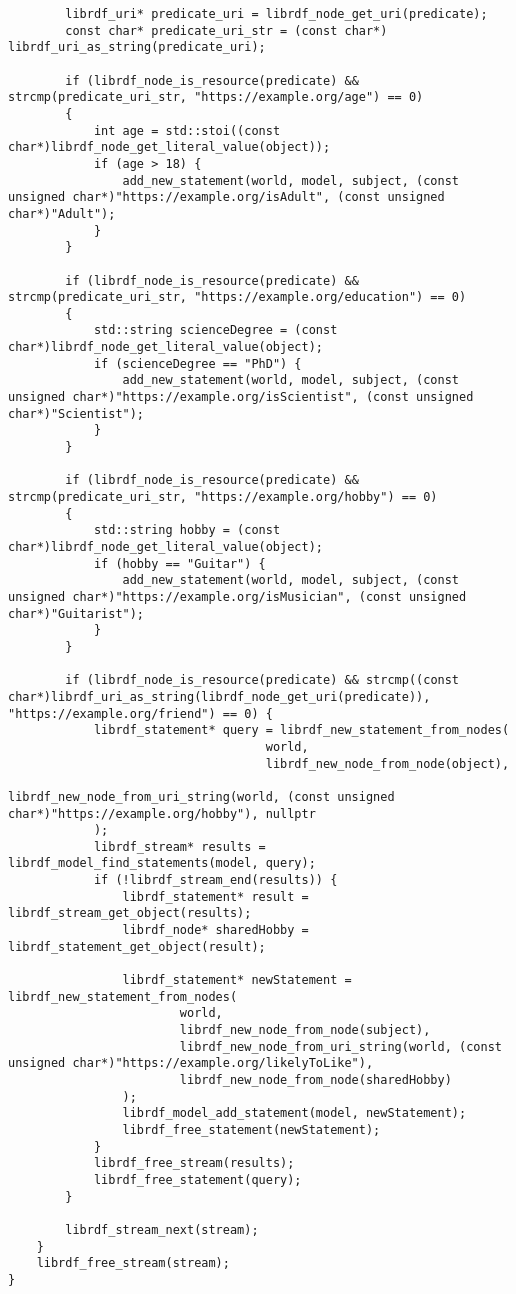 \documentclass[12pt, a4paper]{article}
\begin{document}
\begin{verbatim}
        librdf_uri* predicate_uri = librdf_node_get_uri(predicate);
        const char* predicate_uri_str = (const char*) librdf_uri_as_string(predicate_uri);

        if (librdf_node_is_resource(predicate) && strcmp(predicate_uri_str, "https://example.org/age") == 0)
        {
            int age = std::stoi((const char*)librdf_node_get_literal_value(object));
            if (age > 18) {
                add_new_statement(world, model, subject, (const unsigned char*)"https://example.org/isAdult", (const unsigned char*)"Adult");
            }
        }

        if (librdf_node_is_resource(predicate) && strcmp(predicate_uri_str, "https://example.org/education") == 0)
        {
            std::string scienceDegree = (const char*)librdf_node_get_literal_value(object);
            if (scienceDegree == "PhD") {
                add_new_statement(world, model, subject, (const unsigned char*)"https://example.org/isScientist", (const unsigned char*)"Scientist");
            }
        }

        if (librdf_node_is_resource(predicate) && strcmp(predicate_uri_str, "https://example.org/hobby") == 0)
        {
            std::string hobby = (const char*)librdf_node_get_literal_value(object);
            if (hobby == "Guitar") {
                add_new_statement(world, model, subject, (const unsigned char*)"https://example.org/isMusician", (const unsigned char*)"Guitarist");
            }
        }

        if (librdf_node_is_resource(predicate) && strcmp((const char*)librdf_uri_as_string(librdf_node_get_uri(predicate)), "https://example.org/friend") == 0) {
            librdf_statement* query = librdf_new_statement_from_nodes(
                                    world,
                                    librdf_new_node_from_node(object),
                                    librdf_new_node_from_uri_string(world, (const unsigned char*)"https://example.org/hobby"), nullptr
            );
            librdf_stream* results = librdf_model_find_statements(model, query);
            if (!librdf_stream_end(results)) {
                librdf_statement* result = librdf_stream_get_object(results);
                librdf_node* sharedHobby = librdf_statement_get_object(result);

                librdf_statement* newStatement = librdf_new_statement_from_nodes(
                        world,
                        librdf_new_node_from_node(subject),
                        librdf_new_node_from_uri_string(world, (const unsigned char*)"https://example.org/likelyToLike"),
                        librdf_new_node_from_node(sharedHobby)
                );
                librdf_model_add_statement(model, newStatement);
                librdf_free_statement(newStatement);
            }
            librdf_free_stream(results);
            librdf_free_statement(query);
        }

        librdf_stream_next(stream);
    }
    librdf_free_stream(stream);
}
\end{verbatim}
\end{document}
